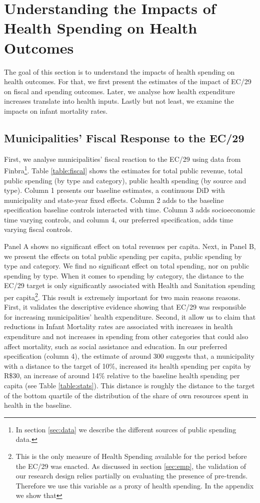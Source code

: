 \section{Understanding the Impacts of Health Spending on Health Outcomes}\label{sec:results}

The goal of this section is to understand the impacts of health spending on health outcomes. For that, we first present the estimates of the impact of EC/29 on fiscal and spending outcomes. Later, we analyse how health expenditure increases translate into health inputs. Lastly but not least, we examine the impacts on infant mortality rates.

\subsection{Municipalities' Fiscal Response to the EC/29}

First, we analyse municipalities' fiscal reaction to the EC/29 using data from Finbra\footnote{In section \ref{sec:data} we describe the different sources of public spending data.}. Table \ref{table:fiscal} shows the estimates for total public revenue, total public spending (by type and category), public health spending (by source and type).  Column 1 presents our baseline estimates, a continuous DiD with municipality and state-year fixed effects. Column 2 adds to the baseline specification baseline controls interacted with time. Column 3 adds socioeconomic time varying controls, and column 4, our preferred specification, adds time varying fiscal controls. 

Panel A shows no significant effect on total revenues per capita. Next, in Panel B, we present the effects on total public spending per capita, public spending by type and category. We find no significant effect on total spending, nor on public spending by type. When it comes to spending by category, the distance to the EC/29 target is only significantly associated with Health and Sanitation spending per capita\footnote{This is the only measure of Health Spending available for the period before the EC/29 was enacted. As discussed in section \ref{sec:emp}, the validation of our research design relies partially on evaluating the presence of pre-trends. Therefore we use this variable as a proxy of health spending. In the appendix we show that}. This result is extremely important for two main reasons reasons. First, it validates the descriptive evidence showing that EC/29 was responsible for increasing municipalities' health expenditure. Second, it allow us to claim that reductions in Infant Mortality rates are associated with increases in health expenditure and not increases in spending from other categories that could also affect mortality, such as social assistance and education. In our preferred specification (column 4), the estimate of around 300 suggests that, a municipality with a distance to the target of 10\%, increased its health spending per capita by R\$30, an increase of around 14\% relative to the baseline health spending per capita (see Table \ref{table:stats}). This distance is roughly the distance to the target of the bottom quartile of the distribution of the share of own resources spent in health in the baseline. 

